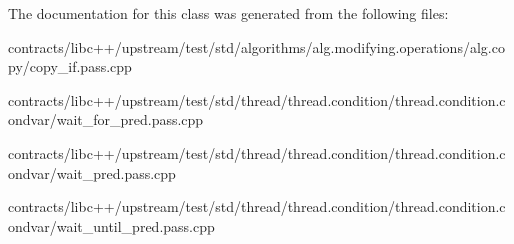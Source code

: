 The documentation for this class was generated from the following files\+:\begin{DoxyCompactItemize}
\item 
contracts/libc++/upstream/test/std/algorithms/alg.\+modifying.\+operations/alg.\+copy/copy\+\_\+if.\+pass.\+cpp\item 
contracts/libc++/upstream/test/std/thread/thread.\+condition/thread.\+condition.\+condvar/wait\+\_\+for\+\_\+pred.\+pass.\+cpp\item 
contracts/libc++/upstream/test/std/thread/thread.\+condition/thread.\+condition.\+condvar/wait\+\_\+pred.\+pass.\+cpp\item 
contracts/libc++/upstream/test/std/thread/thread.\+condition/thread.\+condition.\+condvar/wait\+\_\+until\+\_\+pred.\+pass.\+cpp\end{DoxyCompactItemize}
